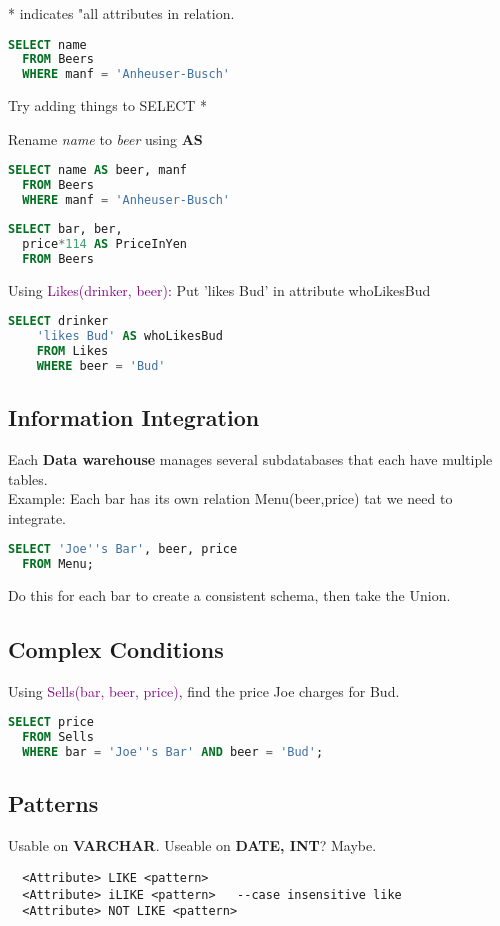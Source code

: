 \documentclass[12pt]{article}
\begin{document}
* indicates "all attributes in relation.
\begin{lstlisting}[language=SQL]
  SELECT name
  FROM Beers
  WHERE manf = 'Anheuser-Busch'
\end{lstlisting}
Try adding things to SELECT *

Rename \emph{name} to \emph{beer} using \textbf{AS}
\begin{lstlisting}[language=SQL]
  SELECT name AS beer, manf
  FROM Beers
  WHERE manf = 'Anheuser-Busch'
\end{lstlisting}

\begin{lstlisting}[language=SQL]
  SELECT bar, ber,
  price*114 AS PriceInYen
  FROM Beers
\end{lstlisting}

Using \textcolor{purple}{Likes(drinker, beer)}:
Put 'likes Bud' in attribute whoLikesBud
\begin{lstlisting}[language=SQL]
  SELECT drinker
    'likes Bud' AS whoLikesBud
    FROM Likes
    WHERE beer = 'Bud'
\end{lstlisting}

\subsection{Information Integration}
Each \textbf{Data warehouse} manages several subdatabases that each have multiple tables.\\

Example: Each bar has its own relation Menu(beer,price) tat we need to
integrate.
\begin{lstlisting}[language=SQL]
  SELECT 'Joe''s Bar', beer, price
  FROM Menu;
\end{lstlisting}
Do this for each bar to create a consistent schema, then take the Union.

\subsection{Complex Conditions}
Using \textcolor{purple}{Sells(bar, beer, price)}, find the price Joe charges
for Bud.  
\begin{lstlisting}[language=SQL]
  SELECT price
  FROM Sells
  WHERE bar = 'Joe''s Bar' AND beer = 'Bud';
\end{lstlisting}

\subsection{Patterns}
Usable on \textbf{VARCHAR}. Useable on \textbf{DATE, INT}? Maybe.
\begin{verbatim}
  <Attribute> LIKE <pattern>
  <Attribute> iLIKE <pattern>   --case insensitive like
  <Attribute> NOT LIKE <pattern>
\end{verbatim}
\end{document}
